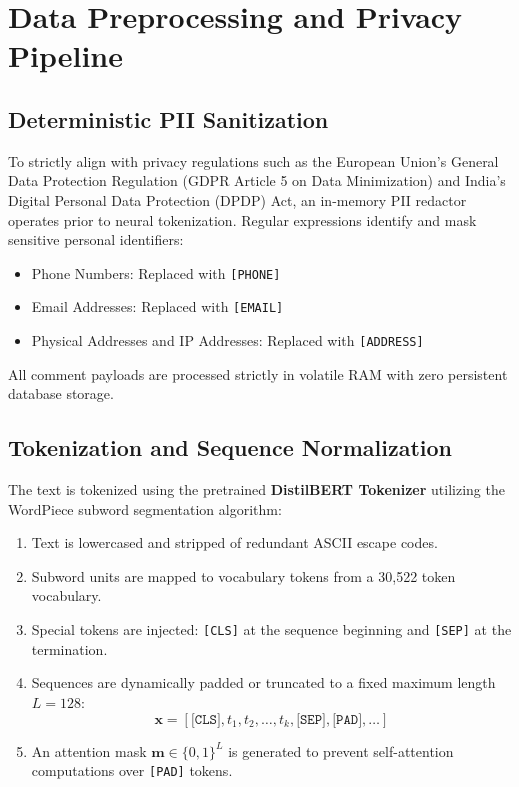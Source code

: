 \documentclass[12pt,a4paper]{article}
\begin{document}
\section{Data Preprocessing and Privacy Pipeline}

\subsection{Deterministic PII Sanitization}
To strictly align with privacy regulations such as the European Union's General Data Protection Regulation (GDPR Article 5 on Data Minimization) and India's Digital Personal Data Protection (DPDP) Act, an in-memory PII redactor operates prior to neural tokenization. Regular expressions identify and mask sensitive personal identifiers:
\begin{itemize}
    \item Phone Numbers: Replaced with \texttt{[PHONE]}
    \item Email Addresses: Replaced with \texttt{[EMAIL]}
    \item Physical Addresses and IP Addresses: Replaced with \texttt{[ADDRESS]}
\end{itemize}
All comment payloads are processed strictly in volatile RAM with zero persistent database storage.

\subsection{Tokenization and Sequence Normalization}
The text is tokenized using the pretrained \textbf{DistilBERT Tokenizer} utilizing the WordPiece subword segmentation algorithm:
\begin{enumerate}
    \item Text is lowercased and stripped of redundant ASCII escape codes.
    \item Subword units are mapped to vocabulary tokens from a 30,522 token vocabulary.
    \item Special tokens are injected: \texttt{[CLS]} at the sequence beginning and \texttt{[SEP]} at the termination.
    \item Sequences are dynamically padded or truncated to a fixed maximum length $L = 128$:
    \begin{equation}
        \mathbf{x} = [\texttt{[CLS]}, t_1, t_2, \dots, t_k, \texttt{[SEP]}, \texttt{[PAD]}, \dots]
    \end{equation}
    \item An attention mask $\mathbf{m} \in \{0, 1\}^L$ is generated to prevent self-attention computations over \texttt{[PAD]} tokens.
\end{enumerate}
\end{document}
